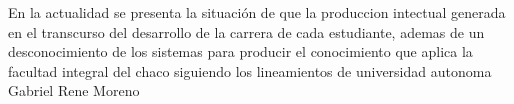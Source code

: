 En la actualidad se presenta la situación de que la produccion intectual generada en el transcurso del desarrollo de la carrera de cada estudiante, ademas de un desconocimiento de los sistemas para producir el conocimiento que aplica la facultad integral del chaco siguiendo los lineamientos de universidad autonoma Gabriel Rene Moreno
